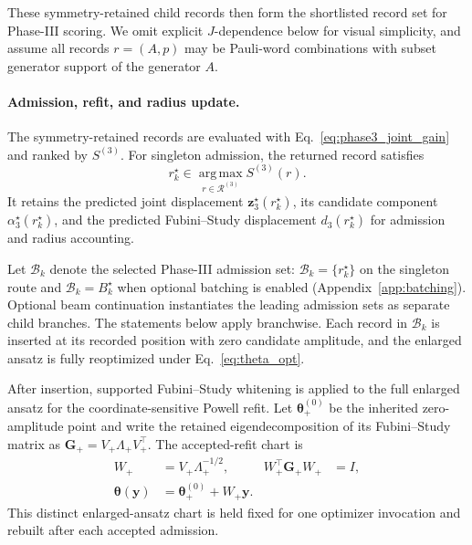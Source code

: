 \documentclass[
  reprint,
  amsmath,
  amssymb,
  aps,
  pra,
  nofootinbib,
  superscriptaddress,
  floatfix
]{revtex4-2}
\begin{document}
These symmetry-retained child records then form the shortlisted record set for
Phase-III scoring. We omit explicit
\(J\)-dependence below for visual simplicity, and assume all records
\(r=(A,p)\) may be Pauli-word combinations with subset generator support of
the generator \(A\).

\paragraph*{Admission, refit, and radius update.}
%
The symmetry-retained records are evaluated with
Eq.~\eqref{eq:phase3_joint_gain} and ranked by \(S^{(3)}\). For singleton
admission, the returned record satisfies
\begin{equation*}
r_k^\star
\in
\operatorname*{arg\,max}_{r\in\mathcal R^{(3)}}S^{(3)}(r).
\end{equation*}
It retains the predicted joint displacement
\(\mathbf z_3^\star(r_k^\star)\), its candidate component
\(\alpha_3^\star(r_k^\star)\), and the predicted Fubini--Study displacement
\(d_3(r_k^\star)\) for admission and radius accounting.

Let \(\mathcal B_k\) denote the selected Phase-III admission set:
\(\mathcal B_k=\{r_k^\star\}\) on the singleton route and
\(\mathcal B_k=B_k^\star\) when optional batching is enabled
(Appendix~\ref{app:batching}). Optional beam continuation instantiates the
leading admission sets as separate child branches. The statements below apply
branchwise. Each record in \(\mathcal B_k\) is inserted at its recorded
position with zero candidate amplitude, and the enlarged ansatz is fully
reoptimized under Eq.~\eqref{eq:theta_opt}.

After insertion, supported Fubini--Study whitening is applied to the full
enlarged ansatz for the coordinate-sensitive Powell refit.
Let \(\boldsymbol\theta_+^{(0)}\) be the inherited zero-amplitude point and
write the retained eigendecomposition of its Fubini--Study matrix as
\(\mathbf G_+=V_+\Lambda_+V_+^{\top}\). The accepted-refit chart is
\begin{equation}
\begin{aligned}
W_+&=V_+\Lambda_+^{-1/2},
&W_+^{\top}\mathbf G_+W_+&=I,\\
\boldsymbol\theta(\mathbf y)
&=\boldsymbol\theta_+^{(0)}+W_+\mathbf y.
\end{aligned}
\label{eq:accepted_refit_whitening}
\end{equation}
This distinct enlarged-ansatz chart is held fixed for one optimizer invocation
and rebuilt after each accepted admission.
\end{document}
